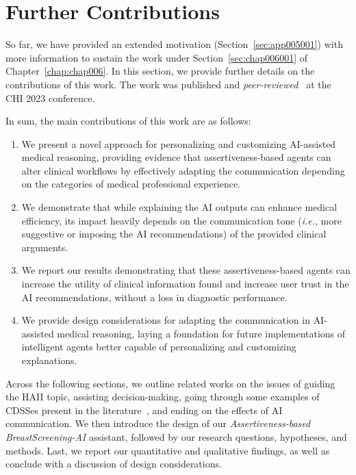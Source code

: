 \section{Further Contributions}
\label{sec:app005002}

So far, we have provided an extended motivation (Section~\ref{sec:app005001}) with more information to sustain the work under Section~\ref{sec:chap006001} of Chapter~\ref{chap:chap006}.
In this section, we provide further details on the contributions of this work.
The work was published and {\it peer-reviewed}~\cite{10.1145/3544548.3580682} at the \acs{CHI} 2023 conference.

\vspace{0.50mm}

\noindent
In sum, the main contributions of this work are as follows:

\vspace{0.05mm}

\begin{enumerate}
\item We present a novel approach for personalizing and customizing \ac{AI}-assisted medical reasoning, providing evidence that assertiveness-based agents can alter clinical workflows by effectively adapting the communication depending on the categories of medical professional experience.
\item We demonstrate that while explaining the \ac{AI} outputs can enhance medical efficiency, its impact heavily depends on the communication tone ({\it i.e.}, more suggestive or imposing the \ac{AI} recommendations) of the provided clinical arguments.
\item We report our results demonstrating that these assertiveness-based agents can increase the utility of clinical information found and increase user trust in the \ac{AI} recommendations, without a loss in diagnostic performance.
\item We provide design considerations for adapting the communication in \ac{AI}-assisted medical reasoning, laying a foundation for future implementations of intelligent agents better capable of personalizing and customizing explanations.
\end{enumerate}

\vspace{0.05mm}

Across the following sections, we outline related works on the issues of guiding the \ac{HAII} topic, assisting decision-making, going through some examples of \acp{CDSSe} present in the literature~\cite{NAISEH2023102941, 10.1145/3531146.3533193}, and ending on the effects of \ac{AI} communication.
We then introduce the design of our {\it Assertiveness-based BreastScreening-AI} assistant, followed by our research questions, hypotheses, and methods.
Last, we report our quantitative and qualitative findings, as well as conclude with a discussion of design considerations.

